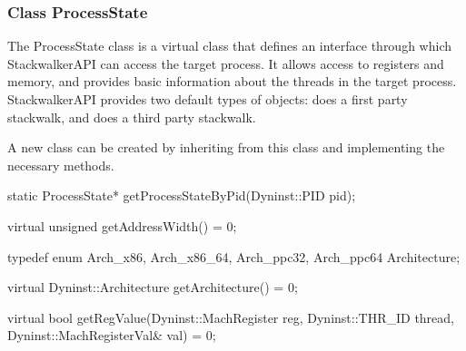 \subsubsection{Class ProcessState}
\label{subsec:processstate}

The ProcessState class is a virtual class that defines an interface through
which StackwalkerAPI can access the target process. It allows access to
registers and memory, and provides basic information about the threads in the
target process. StackwalkerAPI provides two default types of 
objects:  does a first party stackwalk, and  does a third party
stackwalk.

A new  class can be created by inheriting from this class and
implementing the necessary methods.

\begin{apient}
static ProcessState* getProcessStateByPid(Dyninst::PID pid);
\end{apient}


\begin{apient}
virtual unsigned getAddressWidth() = 0;
\end{apient}

\begin{apient}
 typedef enum { Arch_x86, Arch_x86_64, Arch_ppc32, Arch_ppc64 } Architecture;

 virtual Dyninst::Architecture getArchitecture() = 0;
\end{apient}

\begin{apient}
virtual bool getRegValue(Dyninst::MachRegister reg,
                         Dyninst::THR_ID thread,
                         Dyninst::MachRegisterVal& val) = 0;
\end{apient}

